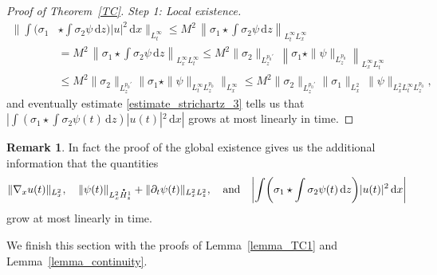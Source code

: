\documentclass[10pt]{amsart}
\theoremstyle{definition}
\newtheorem{rmk}[lemma]{Remark}
\newcommand*{\overbigdot}[1]{%
\accentset{\mbox{\large\bfseries .}}{#1}}
\newenvironment{ProofOf}[1]{\begin{proof}[Proof of #1]}{\end{proof}}
\newcommand{\ud}{\, {\mathrm{d}}}
\begin{document}
\begin{ProofOf}{Theorem~\ref{TC}. Step 1: Local existence}
\begin{equation}
\begin{split}
\biggl\|\int(\sigma_{1}&\star\int\sigma_{2}\psi\ud z)|u|^{2}\ud x\biggr\|_{L_{t}^{\infty}}\leq M^{2}\,\left\|\sigma_{1}\star\int\sigma_{2}\psi\ud z\right\|_{L_{t}^{\infty}L_{x}^{\infty}}\\
&=M^{2}\,\left\|\sigma_{1}\star\int\sigma_{2}\psi\ud z\right\|_{L_{x}^{\infty}L_{t}^{\infty}}\leq M^{2}\|\sigma_{2}\|_{L_{z}^{p_{0}'}}\,\left\|\sigma_{1}\star\|\psi\|_{L_{z}^{p_{0}}}\right\|_{L_{x}^{\infty}L_{t}^{\infty}}\\
&\leq M^{2}\|\sigma_{2}\|_{L_{z}^{p_{0}'}}\bigl\|\sigma_{1}\star\|\psi\|_{L_{t}^{\infty}L_{z}^{p_{0}}}\bigr\|_{L_{x}^{\infty}}\leq M^{2}\|\sigma_{2}\|_{L_{z}^{p_{0}'}}\|\sigma_{1}\|_{L_{x}^{2}}\,\|\psi\|_{L_{x}^{2}L_{t}^{\infty}L_{z}^{p_{0}}},
\end{split}
\end{equation}
and eventually estimate \eqref{estimate_strichartz_3} tells us that $|\int(\sigma_{1}\star\int\sigma_{2}\psi(t)\ud z)|u(t)|^{2}\ud x|$ grows at most linearly in time.
\end{ProofOf}

\begin{rmk}
In fact the proof of the global existence gives us the additional information that the quantities
\[
\|\nabla_{x}u(t)\|_{L_{x}^{2}},\quad \|\psi(t)\|_{L_{x}^{2}\overbigdot{H}_{z}^{1}}+\|\partial_{t}\psi(t)\|_{L_{x}^{2}L_{z}^{2}},\quad\text{and}\quad
\biggl|\int\biggl(\sigma_{1}\star\int\sigma_{2}\psi(t)\ud z\biggr)|u(t)|^{2}\ud x\biggr|
\]
grow at most linearly in time.
\end{rmk}

We finish this section with the proofs of Lemma~\ref{lemma_TC1} and Lemma~\ref{lemma_continuity}.
\end{document}
